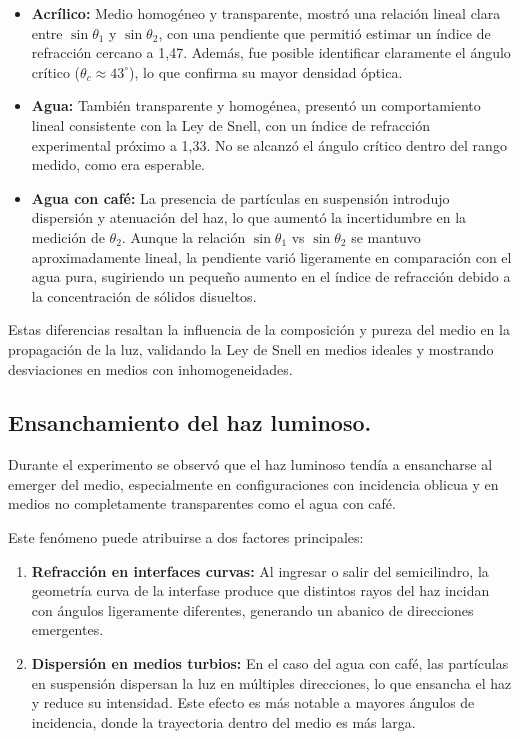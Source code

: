 \documentclass[11pt,twocolumn]{article}
\begin{document}
\begin{itemize}
    \item \textbf{Acrílico:} Medio homogéneo y transparente, mostró una relación lineal clara entre $\sin \theta_1$ y $\sin \theta_2$, con una pendiente que permitió estimar un índice de refracción cercano a 1,47. Además, fue posible identificar claramente el ángulo crítico ($\theta_c \approx 43^\circ$), lo que confirma su mayor densidad óptica.
    
    \item \textbf{Agua:} También transparente y homogénea, presentó un comportamiento lineal consistente con la Ley de Snell, con un índice de refracción experimental próximo a 1,33. No se alcanzó el ángulo crítico dentro del rango medido, como era esperable.
    
    \item \textbf{Agua con café:} La presencia de partículas en suspensión introdujo dispersión y atenuación del haz, lo que aumentó la incertidumbre en la medición de $\theta_2$. Aunque la relación $\sin \theta_1$ vs $\sin \theta_2$ se mantuvo aproximadamente lineal, la pendiente varió ligeramente en comparación con el agua pura, sugiriendo un pequeño aumento en el índice de refracción debido a la concentración de sólidos disueltos.
\end{itemize}

Estas diferencias resaltan la influencia de la composición y pureza del medio en la propagación de la luz, validando la Ley de Snell en medios ideales y mostrando desviaciones en medios con inhomogeneidades.


\subsection{Ensanchamiento del haz luminoso.}

Durante el experimento se observó que el haz luminoso tendía a ensancharse al emerger del medio, especialmente en configuraciones con incidencia oblicua y en medios no completamente transparentes como el agua con café.

Este fenómeno puede atribuirse a dos factores principales:

\begin{enumerate}
    \item \textbf{Refracción en interfaces curvas:} Al ingresar o salir del semicilindro, la geometría curva de la interfase produce que distintos rayos del haz incidan con ángulos ligeramente diferentes, generando un abanico de direcciones emergentes.
    
    \item \textbf{Dispersión en medios turbios:} En el caso del agua con café, las partículas en suspensión dispersan la luz en múltiples direcciones, lo que ensancha el haz y reduce su intensidad. Este efecto es más notable a mayores ángulos de incidencia, donde la trayectoria dentro del medio es más larga.
\end{enumerate}
\end{document}
